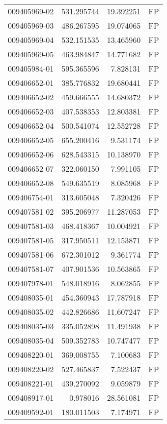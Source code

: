 \begin{tabular}{lrrl}
009405969-02 &  531.295744 &    19.392251 &   FP \\
009405969-03 &  486.267595 &    19.074065 &   FP \\
009405969-04 &  532.151535 &    13.465960 &   FP \\
009405969-05 &  463.984847 &    14.771682 &   FP \\
009405984-01 &  595.365596 &     7.828131 &   FP \\
009406652-01 &  385.776832 &    19.680441 &   FP \\
009406652-02 &  459.666555 &    14.680372 &   FP \\
009406652-03 &  407.538353 &    12.803381 &   FP \\
009406652-04 &  500.541074 &    12.552728 &   FP \\
009406652-05 &  655.200416 &     9.531174 &   FP \\
009406652-06 &  628.543315 &    10.138970 &   FP \\
009406652-07 &  322.060150 &     7.991105 &   FP \\
009406652-08 &  549.635519 &     8.085968 &   FP \\
009406754-01 &  313.605048 &     7.320426 &   FP \\
009407581-02 &  395.206977 &    11.287053 &   FP \\
009407581-03 &  468.418367 &    10.004921 &   FP \\
009407581-05 &  317.950511 &    12.153871 &   FP \\
009407581-06 &  672.301012 &     9.361774 &   FP \\
009407581-07 &  407.901536 &    10.563865 &   FP \\
009407978-01 &  548.018916 &     8.062855 &   FP \\
009408035-01 &  454.360943 &    17.787918 &   FP \\
009408035-02 &  442.826686 &    11.607247 &   FP \\
009408035-03 &  335.052898 &    11.491938 &   FP \\
009408035-04 &  509.352783 &    10.747477 &   FP \\
009408220-01 &  369.008755 &     7.100683 &   FP \\
009408220-02 &  527.465837 &     7.522437 &   FP \\
009408221-01 &  439.270092 &     9.059879 &   FP \\
009408917-01 &    0.978016 &    28.561081 &   FP \\
009409592-01 &  180.011503 &     7.174971 &   FP \\

\end{tabular}
